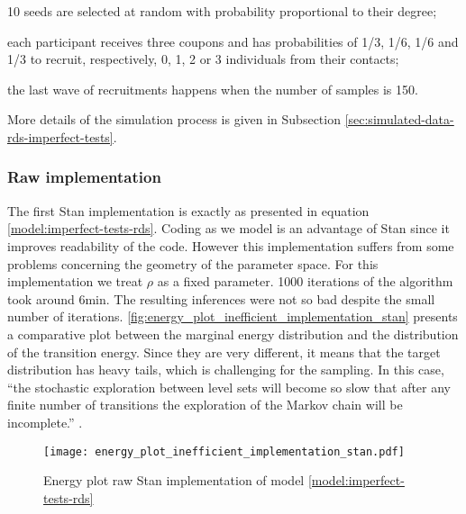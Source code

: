\begin{alineas}
  \item 10 seeds are selected at random with probability proportional to their
  degree;
  \item each participant receives three coupons and has probabilities of 1/3,
  1/6, 1/6 and 1/3 to recruit, respectively, 0, 1, 2 or 3 individuals from their
  contacts;
  \item the last wave of recruitments happens when the number of samples
  is 150.
\end{alineas}

More details of the simulation process is given in Subsection
\ref{sec:simulated-data-rds-imperfect-tests}.

\subsubsection*{Raw implementation}

The first Stan implementation is exactly as presented in equation
\eqref{model:imperfect-tests-rds}. Coding as we model is an advantage of Stan
since it improves readability of the code. However this implementation suffers from
some problems concerning the geometry of the parameter space. For this
implementation we treat $\rho$ as a fixed parameter. 1000 iterations of the
algorithm took around 6min. The resulting inferences were not so bad despite
the small number of iterations.
\autoref{fig:energy_plot_inefficient_implementation_stan} presents a
comparative plot between the marginal energy distribution and the distribution
of the transition energy. Since they are very different, it means that the
target distribution has heavy tails, which is challenging for the sampling. In
this case, ``the stochastic exploration between level sets will become so slow that after any finite
number of transitions the exploration of the Markov chain will be
incomplete.'' \cite[p. 44]{betancourt2017conceptual}.

\begin{figure}
  \centering
  \caption{\label{fig:energy_plot_inefficient_implementation_stan}Energy plot
    raw Stan implementation of model \eqref{model:imperfect-tests-rds}}
  \texttt{[image: energy\_plot\_inefficient\_implementation\_stan.pdf]}
\end{figure}

